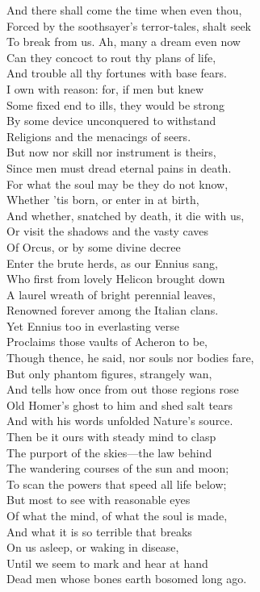 And there shall come the time when even thou,\\
Forced by the soothsayer's terror-tales, shalt seek\\
To break from us. Ah, many a dream even now\\
Can they concoct to rout thy plans of life,\\
And trouble all thy fortunes with base fears.\\
I own with reason: for, if men but knew\\
Some fixed end to ills, they would be strong\\
By some device unconquered to withstand\\
Religions and the menacings of seers.\\
But now nor skill nor instrument is theirs,\\
Since men must dread eternal pains in death.\\
For what the soul may be they do not know,\\
Whether 'tis born, or enter in at birth,\\
And whether, snatched by death, it die with us,\\
Or visit the shadows and the vasty caves\\
Of Orcus, or by some divine decree\\
Enter the brute herds, as our Ennius sang,\\
Who first from lovely Helicon brought down\\
A laurel wreath of bright perennial leaves,\\
Renowned forever among the Italian clans.\\
Yet Ennius too in everlasting verse\\
Proclaims those vaults of Acheron to be,\\
Though thence, he said, nor souls nor bodies fare,\\
But only phantom figures, strangely wan,\\
And tells how once from out those regions rose\\
Old Homer's ghost to him and shed salt tears\\
And with his words unfolded Nature's source.\\
Then be it ours with steady mind to clasp\\
The purport of the skies—the law behind\\
The wandering courses of the sun and moon;\\
To scan the powers that speed all life below;\\
But most to see with reasonable eyes\\
Of what the mind, of what the soul is made,\\
And what it is so terrible that breaks\\
On us asleep, or waking in disease,\\
Until we seem to mark and hear at hand\\
Dead men whose bones earth bosomed long ago.

